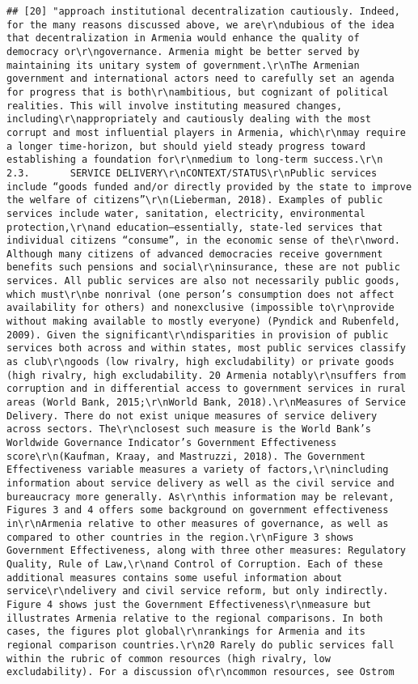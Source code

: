 \documentclass[
]{article}
\begin{document}
\begin{verbatim}
## [20] "approach institutional decentralization cautiously. Indeed, for the many reasons discussed above, we are\r\ndubious of the idea that decentralization in Armenia would enhance the quality of democracy or\r\ngovernance. Armenia might be better served by maintaining its unitary system of government.\r\nThe Armenian government and international actors need to carefully set an agenda for progress that is both\r\nambitious, but cognizant of political realities. This will involve instituting measured changes, including\r\nappropriately and cautiously dealing with the most corrupt and most influential players in Armenia, which\r\nmay require a longer time-horizon, but should yield steady progress toward establishing a foundation for\r\nmedium to long-term success.\r\n  2.3.       SERVICE DELIVERY\r\nCONTEXT/STATUS\r\nPublic services include “goods funded and/or directly provided by the state to improve the welfare of citizens”\r\n(Lieberman, 2018). Examples of public services include water, sanitation, electricity, environmental protection,\r\nand education—essentially, state-led services that individual citizens “consume”, in the economic sense of the\r\nword. Although many citizens of advanced democracies receive government benefits such pensions and social\r\ninsurance, these are not public services. All public services are also not necessarily public goods, which must\r\nbe nonrival (one person’s consumption does not affect availability for others) and nonexclusive (impossible to\r\nprovide without making available to mostly everyone) (Pyndick and Rubenfeld, 2009). Given the significant\r\ndisparities in provision of public services both across and within states, most public services classify as club\r\ngoods (low rivalry, high excludability) or private goods (high rivalry, high excludability. 20 Armenia notably\r\nsuffers from corruption and in differential access to government services in rural areas (World Bank, 2015;\r\nWorld Bank, 2018).\r\nMeasures of Service Delivery. There do not exist unique measures of service delivery across sectors. The\r\nclosest such measure is the World Bank’s Worldwide Governance Indicator’s Government Effectiveness score\r\n(Kaufman, Kraay, and Mastruzzi, 2018). The Government Effectiveness variable measures a variety of factors,\r\nincluding information about service delivery as well as the civil service and bureaucracy more generally. As\r\nthis information may be relevant, Figures 3 and 4 offers some background on government effectiveness in\r\nArmenia relative to other measures of governance, as well as compared to other countries in the region.\r\nFigure 3 shows Government Effectiveness, along with three other measures: Regulatory Quality, Rule of Law,\r\nand Control of Corruption. Each of these additional measures contains some useful information about service\r\ndelivery and civil service reform, but only indirectly. Figure 4 shows just the Government Effectiveness\r\nmeasure but illustrates Armenia relative to the regional comparisons. In both cases, the figures plot global\r\nrankings for Armenia and its regional comparison countries.\r\n20 Rarely do public services fall within the rubric of common resources (high rivalry, low excludability). For a discussion of\r\ncommon resources, see Ostrom 
\end{verbatim}
\end{document}
